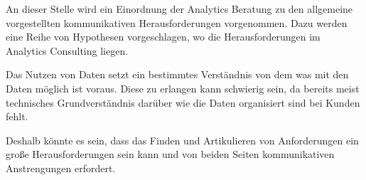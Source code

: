 \documentclass[../main.tex]{subfiles}
\begin{document}
An dieser Stelle wird ein Einordnung der Analytics Beratung zu den allgemeine vorgestellten kommunikativen Herausforderungen vorgenommen.
Dazu werden eine Reihe von Hypothesen vorgeschlagen, wo die Herausforderungen im Analytics Consulting liegen.

Das Nutzen von Daten setzt ein bestimmtes Verständnis von dem was mit den Daten möglich ist voraus.
Diese zu erlangen kann schwierig sein, da bereits meist technisches Grundverständnis darüber wie die Daten organisiert sind bei Kunden fehlt.
\autocite{tsai2015big}

Deshalb könnte es sein, dass das Finden und Artikulieren von Anforderungen ein große Herausforderungen sein kann und von beiden Seiten kommunikativen Anstrengungen erfordert.
\end{document}

